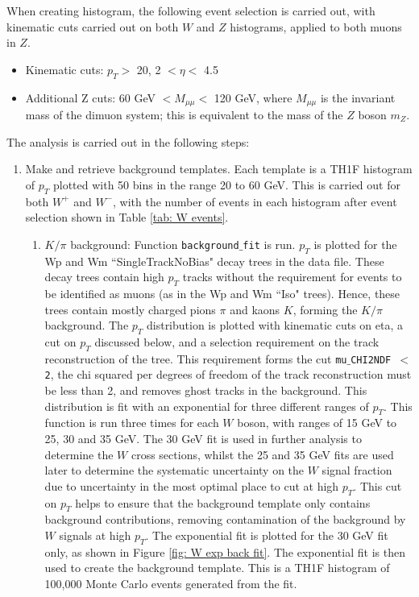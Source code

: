 \documentclass[a4paper,12pt]{article}
\begin{document}
When creating histogram, the following event selection is carried out, with kinematic cuts carried out on both $W$ and $Z$ histograms, applied to both muons in $Z$.
\begin{itemize}
    \item Kinematic cuts: $p_T >$ 20, 2 $< \eta <$ 4.5
    \item Additional Z cuts: 60 GeV $< M_{\mu\mu} <$ 120 GeV, where $M_{\mu\mu}$ is the invariant mass of the dimuon system; this is equivalent to the mass of the $Z$ boson $m_Z$.
\end{itemize}

The analysis is carried out in the following steps:
\begin{enumerate}
    \item Make and retrieve background templates. Each template is a TH1F histogram of $p_T$ plotted with 50 bins in the range 20 to 60 GeV. This is carried out for both $W^+$ and $W^-$, with the number of events in each histogram after event selection shown in Table \ref{tab: W events}.
    \begin{enumerate}
        \item $K/\pi$ background: Function \texttt{background$\_$fit} is run. $p_T$ is plotted for the Wp and Wm ``SingleTrackNoBias" decay trees in the data file. These decay trees contain high $p_T$ tracks without the requirement for events to be identified as muons (as in the Wp and Wm ``Iso" trees). Hence, these trees contain mostly charged pions $\pi$ and kaons $K$, forming the $K/\pi$ background.
The $p_T$ distribution is plotted with kinematic cuts on eta, a cut on $p_T$ discussed below, and a selection requirement on the track reconstruction of the tree. This requirement forms the cut \texttt{mu$\_$CHI2NDF $<$ 2}, the chi squared per degrees of freedom of the track reconstruction must be less than 2, and removes ghost tracks in the background.
          \newline This distribution is fit with an exponential for three different ranges of $p_T$. This function is run three times for each $W$ boson, with ranges of 15 GeV to 25, 30 and 35 GeV. The 30 GeV fit is used in further analysis to determine the $W$ cross sections, whilst the 25 and 35 GeV fits are used later to determine the systematic uncertainty on the $W$ signal fraction due to uncertainty in the most optimal place to cut at high $p_T$. This cut on $p_T$ helps to ensure that the background template only contains background contributions, removing contamination of the background by $W$ signals at high $p_T$.
The exponential fit is plotted for the 30 GeV fit only, as shown in Figure \ref{fig: W exp back fit}.
          \newline The exponential fit is then used to create the background template. This is a TH1F histogram of 100,000 Monte Carlo events generated from the fit.
          

\end{enumerate}
\end{enumerate}
\end{document}
